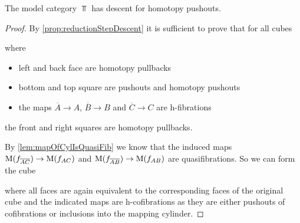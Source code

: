 \begin{prop}\label{lem:topDescentPo}
    The model category $\Top$ has descent for homotopy pushouts. 
    \begin{proof}
        By \cref{prop:reductionStepDescent} it is sufficient to prove that for all cubes 
        \begin{center}
        \end{center}
        where 
        \begin{itemize}
            \item left and back face are homotopy pullbacks
            \item bottom and top square are pushouts and homotopy pushouts
            \item the maps $\overline{A}\to A$, $\overline{B}\to B$ and $\overline{C}\to C$ are h-fibrations
        \end{itemize}
        the front and right squares are homotopy pullbacks.

        By \cref{lem:mapOfCylIsQuasiFib} we know that the induced maps $\operatorname{M}(f_{\overline{A}\overline{C}})\to\operatorname{M}(f_{AC})$ and $\operatorname{M}(f_{\overline{A}\overline{B}})\to\operatorname{M}(f_{AB})$ are quasifibrations. %
        So we can form the cube 
        \begin{center}
        \end{center}
        where all faces are again equivalent to the corresponding faces of the original cube and the indicated maps are h-cofibrations as they are either pushouts of cofibrations or inclusions into the mapping cylinder. %
        

\end{proof}
\end{prop}
